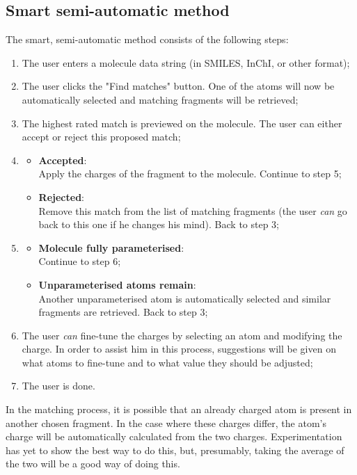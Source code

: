 \subsection{Smart semi-automatic method}
The smart, semi-automatic method consists of the following steps:
\begin{enumerate}[itemsep=.1em, parsep=.2em, topsep=0em]
\item The user enters a molecule data string (in SMILES, InChI, or other format);
\item The user clicks the "Find matches" button. One of the atoms will now be automatically selected and matching fragments will be retrieved;
\item The highest rated match is previewed on the molecule. The user can either accept or reject this proposed match;
\item
\begin{itemize}[leftmargin=0cm, itemsep=.1em, parsep=.1em]
\item[] {\bf Accepted}:\\Apply the charges of the fragment to the molecule. Continue to step 5;
\item[]{\bf Rejected}:\\Remove this match from the list of matching fragments (the user \emph{can} go back to this one if he changes his mind). Back to step 3;
\end{itemize}
\item
\begin{itemize}[leftmargin=0cm, itemsep=.1em, parsep=.1em]
\item[] {\bf Molecule fully parameterised}:\\Continue to step 6;
\item[]{\bf Unparameterised atoms remain}:\\Another unparameterised atom is automatically selected and similar fragments are retrieved. Back to step 3;
\end{itemize}
\item The user \emph{can} fine-tune the charges by selecting an atom and modifying the charge. In order to assist him in this process, suggestions will be given on what atoms to fine-tune and to what value they should be adjusted;
\item The user is done.
\end{enumerate}

\noindent
In the matching process, it is possible that an already charged atom is present in another chosen fragment. In the case where these charges differ, the atom's charge will be automatically calculated from the two charges. Experimentation has yet to show the best way to do this, but, presumably, taking the average of the two will be a good way of doing this.


